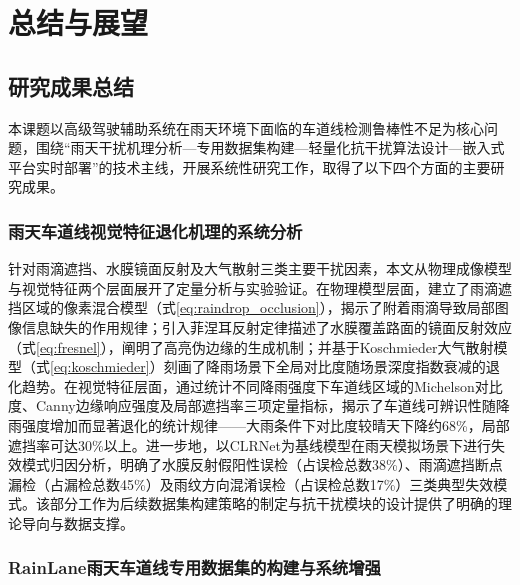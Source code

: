 \chapter{总结与展望}
\label{chap:conclusion}

\section{研究成果总结}
\label{sec:achievement}

本课题以高级驾驶辅助系统在雨天环境下面临的车道线检测鲁棒性不足为核心问题，围绕“雨天干扰机理分析—专用数据集构建—轻量化抗干扰算法设计—嵌入式平台实时部署”的技术主线，开展系统性研究工作，取得了以下四个方面的主要研究成果。

\subsection{雨天车道线视觉特征退化机理的系统分析}

针对雨滴遮挡、水膜镜面反射及大气散射三类主要干扰因素，本文从物理成像模型与视觉特征两个层面展开了定量分析与实验验证。在物理模型层面，建立了雨滴遮挡区域的像素混合模型（式\ref{eq:raindrop_occlusion}），揭示了附着雨滴导致局部图像信息缺失的作用规律；引入菲涅耳反射定律描述了水膜覆盖路面的镜面反射效应（式\ref{eq:fresnel}），阐明了高亮伪边缘的生成机制；并基于Koschmieder大气散射模型（式\ref{eq:koschmieder}）刻画了降雨场景下全局对比度随场景深度指数衰减的退化趋势。在视觉特征层面，通过统计不同降雨强度下车道线区域的Michelson对比度、Canny边缘响应强度及局部遮挡率三项定量指标，揭示了车道线可辨识性随降雨强度增加而显著退化的统计规律——大雨条件下对比度较晴天下降约68\%，局部遮挡率可达30\%以上。进一步地，以CLRNet为基线模型在雨天模拟场景下进行失效模式归因分析，明确了水膜反射假阳性误检（占误检总数38\%）、雨滴遮挡断点漏检（占漏检总数45\%）及雨纹方向混淆误检（占误检总数17\%）三类典型失效模式。该部分工作为后续数据集构建策略的制定与抗干扰模块的设计提供了明确的理论导向与数据支撑。

\subsection{RainLane雨天车道线专用数据集的构建与系统增强}

